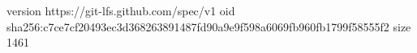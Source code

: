 version https://git-lfs.github.com/spec/v1
oid sha256:c7ce7cf20493ec3d368263891487fd90a9e9f598a6069fb960fb1799f58555f2
size 1461
